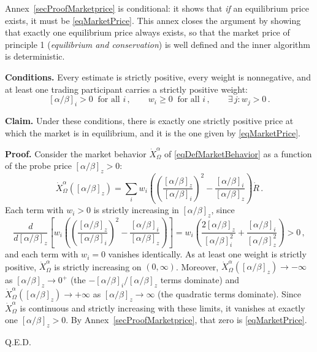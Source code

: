 \documentclass[letterpaper]{article}
\newcommand{\priceAB}{\left[\alpha / \beta\right]}
\begin{document}
Annex~\ref{secProofMarketprice} is conditional: it shows that \emph{if} an equilibrium price exists, it must be \eqref{eqMarketPrice}. This annex closes the argument by showing that exactly one equilibrium price always exists, so that the market price of principle 1 (\emph{equilibrium and conservation}) is well defined and the inner algorithm is deterministic.

\textbf{Conditions.} Every estimate is strictly positive, every weight is nonnegative, and at least one trading participant carries a strictly positive weight:
\begin{equation*}
    \priceAB_i > 0 \ \text{ for all } i\,, \qquad w_i \geq 0 \ \text{ for all } i\,, \qquad \exists\, j: w_j > 0\,.
\end{equation*}

\textbf{Claim.} Under these conditions, there is exactly one strictly positive price at which the market is in equilibrium, and it is the one given by \eqref{eqMarketPrice}.

\textbf{Proof.} Consider the market behavior $\dot{X}_\Omega^\alpha$ of \eqref{eqDefMarketBehavior} as a function of the probe price $\priceAB_z > 0$:
\begin{equation*}
    \dot{X}_\Omega^\alpha(\priceAB_z) = \sum_i w_i \left( \left(\frac{\priceAB_z}{\priceAB_i}\right)^2 - \frac{\priceAB_i}{\priceAB_z} \right) \dot{R}\,.
\end{equation*}
Each term with $w_i > 0$ is strictly increasing in $\priceAB_z$, since
\begin{equation*}
    \frac{d}{d\priceAB_z}\left[ w_i \left( \left(\frac{\priceAB_z}{\priceAB_i}\right)^2 - \frac{\priceAB_i}{\priceAB_z} \right) \right] = w_i \left( \frac{2\priceAB_z}{\priceAB_i^2} + \frac{\priceAB_i}{\priceAB_z^2} \right) > 0\,,
\end{equation*}
and each term with $w_i = 0$ vanishes identically. As at least one weight is strictly positive, $\dot{X}_\Omega^\alpha$ is strictly increasing on $(0, \infty)$. Moreover, $\dot{X}_\Omega^\alpha(\priceAB_z) \to -\infty$ as $\priceAB_z \to 0^+$ (the $-\priceAB_i/\priceAB_z$ terms dominate) and $\dot{X}_\Omega^\alpha(\priceAB_z) \to +\infty$ as $\priceAB_z \to \infty$ (the quadratic terms dominate). Since $\dot{X}_\Omega^\alpha$ is continuous and strictly increasing with these limits, it vanishes at exactly one $\priceAB_z > 0$. By Annex~\ref{secProofMarketprice}, that zero is \eqref{eqMarketPrice}.
\begin{flushright}
Q.E.D.
\end{flushright}
\end{document}
